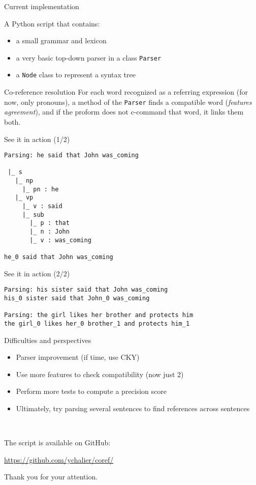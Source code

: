 \documentclass{beamer}
\begin{document}
\begin{frame}{Current implementation}

A Python script that contains:

\begin{itemize}
\item a small grammar and lexicon
\item a very basic top-down parser in a class \texttt{Parser}
\item a \texttt{Node} class to represent a syntax tree
\end{itemize}

\begin{block}{Co-reference resolution}
For each word recognized as a referring expression (for now, only pronouns), a method of the \texttt{Parser} finds a compatible word (\emph{features agreement}), and if the proform does not c-command that word, it links them both.
\end{block}

\end{frame}

\begin{frame}[fragile]{See it in action (1/2)}

\begin{verbatim}
Parsing: he said that John was_coming

 |_ s
   |_ np
     |_ pn : he
   |_ vp
     |_ v : said
     |_ sub
       |_ p : that
       |_ n : John
       |_ v : was_coming

he_0 said that John was_coming
\end{verbatim}

\end{frame}

\begin{frame}[fragile]{See it in action (2/2)}

\begin{verbatim}
Parsing: his sister said that John was_coming
his_0 sister said that John_0 was_coming

Parsing: the girl likes her brother and protects him
the girl_0 likes her_0 brother_1 and protects him_1
\end{verbatim}

\end{frame}

\begin{frame}{Difficulties and perspectives}

\begin{itemize}
\item Parser improvement (if time, use CKY)
\item Use more features to check compatibility (now just 2)
\item Perform more tests to compute a precision score
\item Ultimately, try parsing several sentences to find references across sentences
\end{itemize}

~\par

The script is available on GitHub:

\url{https://github.com/ychalier/coref/}

\end{frame}

\begin{frame}
\begin{center}
Thank you for your attention.
\end{center}
\end{frame}
\end{document}
